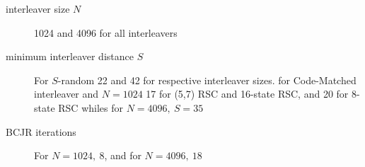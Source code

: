 \documentclass[11pt, oneside, dvipdfmx]{book}
\begin{document}
\begin{description}
\item[interleaver size $N$] 1024 and 4096 for all interleavers

\item[minimum interleaver distance $S$] For $S$-random 22 and 42 for respective interleaver sizes. for Code-Matched interleaver and $N=1024$ 17 for (5,7) RSC and 16-state RSC, and 20 for 8-state RSC whiles for $N=4096, ~S=35$

\item[BCJR iterations] For $N=1024,~8$, and for $N=4096,~18$
\end{description}

 
\end{document}
